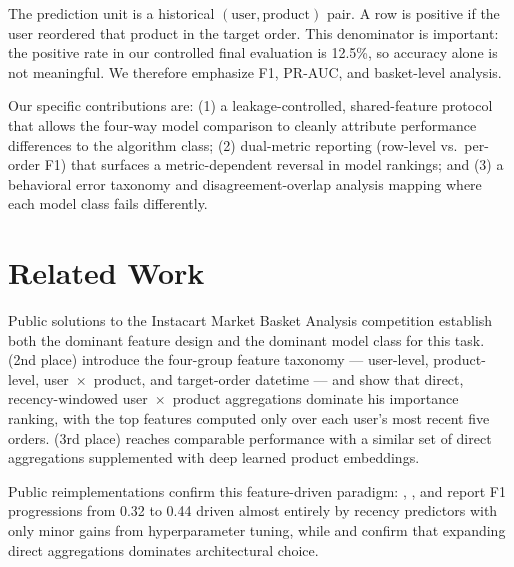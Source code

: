 \documentclass[10pt,twocolumn]{article}
\begin{document}
The prediction unit is a historical $(\text{user}, \text{product})$ pair. A row is positive if the user reordered that product in the target order. This denominator is important: the positive rate in our controlled final evaluation is 12.5\%, so accuracy alone is not meaningful. We therefore emphasize F1, PR-AUC, and basket-level analysis.

Our specific contributions are: (1) a leakage-controlled, shared-feature protocol that allows the four-way model comparison to cleanly attribute performance differences to the algorithm class; (2) dual-metric reporting (row-level vs.\ per-order F1) that surfaces a metric-dependent reversal in model rankings; and (3) a behavioral error taxonomy and disagreement-overlap analysis mapping where each model class fails differently.

\section{Related Work}

Public solutions to the Instacart Market Basket Analysis competition \citep{kaggle2017instacart} establish both the dominant feature design and the dominant model class for this task. \citet{onodera2017instacart} (2nd place) introduce the four-group feature taxonomy --- user-level, product-level, user~$\times$~product, and target-order datetime --- and show that direct, recency-windowed user~$\times$~product aggregations dominate his importance ranking, with the top features computed only over each user's most recent five orders. \citet{vasquez2017instacart} (3rd place) reaches comparable performance with a similar set of direct aggregations supplemented with deep learned product embeddings.

Public reimplementations confirm this feature-driven paradigm: \citet{olsonswanson2018instacart}, \citet{yu2017instacart}, and \citet{syntheticjohn2019instacart} report F1 progressions from 0.32 to 0.44 driven almost entirely by recency predictors with only minor gains from hyperparameter tuning, while \citet{rich2017instacart} and \citet{bhat2022instacart} confirm that expanding direct aggregations dominates architectural choice.
\end{document}
